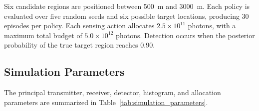 Six candidate regions are positioned between 500~m and 3000~m. Each policy is evaluated over five random seeds and six possible target locations, producing 30 episodes per policy. Each sensing action allocates $2.5\times10^{11}$ photons, with a maximum total budget of $5.0\times10^{12}$ photons. Detection occurs when the posterior probability of the true target region reaches 0.90.

\subsection{Simulation Parameters}

The principal transmitter, receiver, detector, histogram, and allocation
parameters are summarized in Table~\ref{tab:simulation_parameters}.


